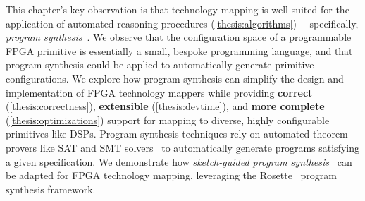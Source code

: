 This chapter's
  key observation is that 
  technology mapping
  is well-suited for the application
  of automated reasoning procedures
  (\cref{thesis:algorithms})---%
  specifically,
  \textit{program synthesis}~\cite{gulwani2017program}.
We observe that 
  the configuration space of
  a programmable FPGA primitive
  is essentially a small, bespoke
  programming language,
  and that
  program synthesis
  could be applied
  to automatically generate
  primitive configurations.
We explore how
  program synthesis
  can simplify the design and implementation of
  FPGA technology mappers while providing
  \textbf{correct} (\cref{thesis:correctness}),
  \textbf{extensible} (\cref{thesis:devtime}), and
  \textbf{more complete}
  (\cref{thesis:optimizations})
  support for mapping to 
  diverse, highly configurable primitives
  like DSPs.
Program synthesis techniques rely on
  automated theorem provers like
  SAT and SMT solvers~\cite{de2008z3, barbosa2022cvc5}
  to automatically generate programs
  satisfying a given specification.
We demonstrate how
 \textit{sketch-guided program synthesis}~\cite{solar2008program}
  can be adapted
  for FPGA technology mapping,
  leveraging the
  Rosette~\cite{torlak2014lightweight} 
  program synthesis framework.


